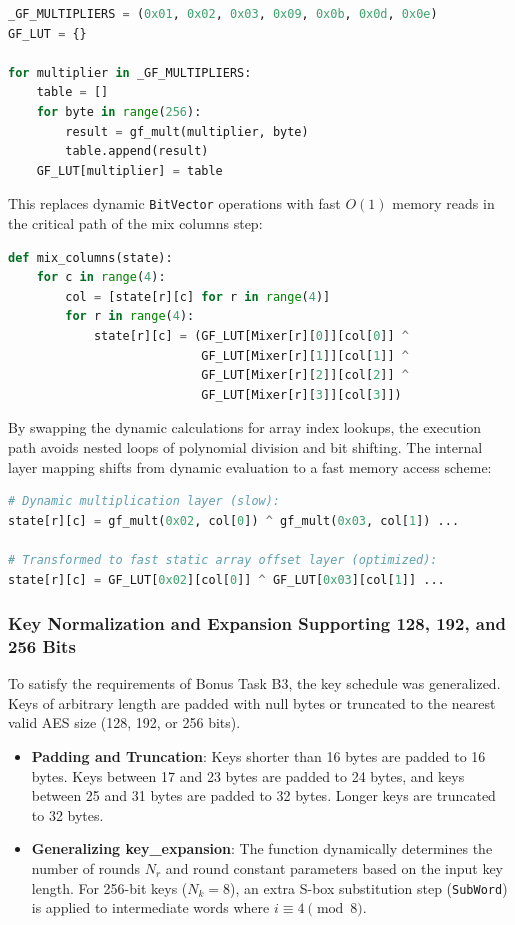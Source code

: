 \documentclass[11pt,a4paper]{article}
\begin{document}
\begin{lstlisting}[language=Python, caption=GF LUT Initialization in 2105032\_AES.py]
_GF_MULTIPLIERS = (0x01, 0x02, 0x03, 0x09, 0x0b, 0x0d, 0x0e)
GF_LUT = {}

for multiplier in _GF_MULTIPLIERS:
    table = []
    for byte in range(256):
        result = gf_mult(multiplier, byte)
        table.append(result)
    GF_LUT[multiplier] = table
\end{lstlisting}

This replaces dynamic \texttt{BitVector} operations with fast $O(1)$ memory reads in the critical path of the mix columns step:
\begin{lstlisting}[language=Python, caption=Optimized MixColumns implementation]
def mix_columns(state):
    for c in range(4):
        col = [state[r][c] for r in range(4)]
        for r in range(4):
            state[r][c] = (GF_LUT[Mixer[r][0]][col[0]] ^
                           GF_LUT[Mixer[r][1]][col[1]] ^
                           GF_LUT[Mixer[r][2]][col[2]] ^
                           GF_LUT[Mixer[r][3]][col[3]])
\end{lstlisting}

By swapping the dynamic calculations for array index lookups, the execution path avoids nested loops of polynomial division and bit shifting. The internal layer mapping shifts from dynamic evaluation to a fast memory access scheme:
\begin{lstlisting}[language=Python, caption=Dynamic multiplication vs. fast static array offset layer]
# Dynamic multiplication layer (slow):
state[r][c] = gf_mult(0x02, col[0]) ^ gf_mult(0x03, col[1]) ...

# Transformed to fast static array offset layer (optimized):
state[r][c] = GF_LUT[0x02][col[0]] ^ GF_LUT[0x03][col[1]] ...
\end{lstlisting}

\subsubsection{Key Normalization and Expansion Supporting 128, 192, and 256 Bits}
To satisfy the requirements of Bonus Task B3, the key schedule was generalized. Keys of arbitrary length are padded with null bytes or truncated to the nearest valid AES size (128, 192, or 256 bits).
\begin{itemize}
    \item \textbf{Padding and Truncation}: Keys shorter than 16 bytes are padded to 16 bytes. Keys between 17 and 23 bytes are padded to 24 bytes, and keys between 25 and 31 bytes are padded to 32 bytes. Longer keys are truncated to 32 bytes.
    \item \textbf{Generalizing key\_expansion}: The function dynamically determines the number of rounds $N_r$ and round constant parameters based on the input key length. For 256-bit keys ($N_k = 8$), an extra S-box substitution step (\texttt{SubWord}) is applied to intermediate words where $i \equiv 4 \pmod 8$.
\end{itemize}
\end{document}
